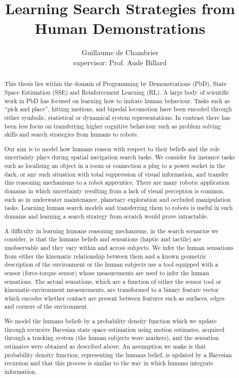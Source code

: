 \documentclass[a4paper,10pt]{article}
\title{Learning Search Strategies from Human Demonstrations}
\author[]{Guillaume de Chambrier\\supervisor: Prof. Aude Billard}
\affil[]{École Polytechnique Fédérale de Lausanne (EPFL), LASA}
\begin{document}
\maketitle

\begin{abstract}
 
This thesis lies within the domain of Programming by Demonstrations (PbD), State Space Estimation (SSE) and Reinforcement Learning (RL). 
A large body of scientific work in PbD has focused on learning how to imitate human behaviour. Tasks such as ``pick and place'', 
hitting motions, and bipedal locomotion have been encoded through either symbolic, statistical or dynamical system representations. 
In contrast there has been less focus on transferring higher cognitive behaviour such as problem solving skills and search strategies 
from humans to robots. 

Our aim is to model how humans reason with respect to their beliefs and the role uncertainty plays during spatial navigation search tasks. 
We consider for instance tasks such as localising  an object in a room or connection a plug to a power socket in the dark, 
or any such situation with total suppression of visual information, and transfer this reasoning mechanisms to a robot apprentice. 
There are many robotic application domains in which uncertainty resulting from a lack of visual perception is common, such as in underwater 
maintenance, planetary exploration and occluded manipulation tasks. Learning human search models and transferring them to robots is useful
in such domains and learning a search strategy from scratch would prove intractable.

A difficulty in learning humans reasoning mechanisms, in the search scenarios we consider, is that the humans 
beliefs and sensations (haptic and tactile) are unobservable and they vary within and across subjects. 
We infer the human sensations from either the kinematic relationship between them and a known geometric description of 
the environment or the human subjects use a tool equipped with a sensor (force-torque sensor) whose measurements 
are used to infer the human sensations. The actual sensations, which are a function of either the sensor tool or kinematic-environment 
measurements, are transformed to a binary feature vector which encodes whether contact are present between features such as 
surfaces, edges and corners of the environment. 

We model the humans beliefs by a probability density function which we update through recursive Bayesian 
state space estimation using motion estimates, acquired through a tracking system (the human subjects wore markers), 
and the sensation estimates were obtained as described above. An assumption we make is that probability 
density function, representing the humans belief, is updated by a Bayesian recursion 
and that this process is similar to the way in which humans integrate information.


\end{abstract}
\end{document}
